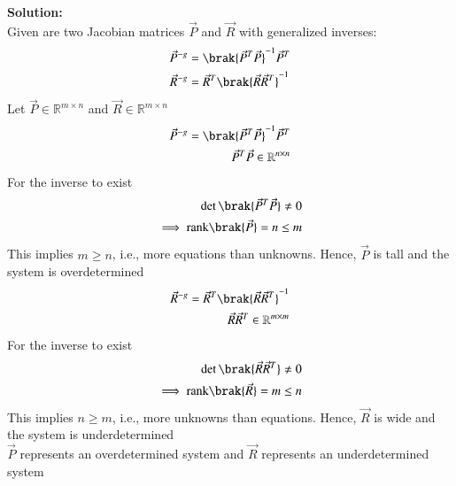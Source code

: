 \documentclass[journal]{IEEEtran}
\begin{document}
\textbf{Solution:}\\
Given are two Jacobian matrices $\vec{P}$ and $\vec{R}$ with generalized inverses:
\begin{align}
    \vec{P}^{-g} &= \brak{\vec{P}^T \vec{P}}^{-1} \vec{P}^T \\
    \vec{R}^{-g} &= \vec{R}^T \brak{\vec{R} \vec{R}^T}^{-1}
\end{align}
Let $\vec{P} \in \mathbb{R}^{m \times n}$ and $\vec{R} \in \mathbb{R}^{m \times n}$
\begin{align}
    \vec{P}^{-g} = \brak{\vec{P}^T \vec{P}}^{-1} \vec{P}^T\\
    \vec{P}^T \vec{P} \in \mathbb{R}^{n \times n}
\end{align}
For the inverse to exist
\begin{align}
   \det\brak{\vec{P}^T \vec{P}} \neq 0 \\
   \implies \text{rank}\brak{\vec{P}} = n \leq m
\end{align}
This implies $m \geq n$, i.e., more equations than unknowns. Hence, $\vec{P}$ is tall and the system is overdetermined
\begin{align}
    \vec{R}^{-g} = \vec{R}^T \brak{\vec{R} \vec{R}^T}^{-1}\\
    \vec{R} \vec{R}^T \in \mathbb{R}^{m \times m}
\end{align}
For the inverse to exist
\begin{align}
    \det\brak{\vec{R} \vec{R}^T} \neq 0 \\
    \implies \text{rank}\brak{\vec{R}} = m \leq n
\end{align}
This implies $n \geq m$, i.e., more unknowns than equations. Hence, $\vec{R}$ is wide and the system is underdetermined\\
$\vec{P}$ represents an overdetermined system and $\vec{R}$ represents an underdetermined system
\end{document}
